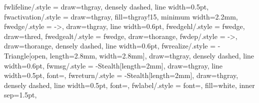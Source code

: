 {    fwlifeline/.style = {draw=thgray, densely dashed, line width=0.5pt},
    fwactivation/.style = {draw=thgray, fill=thgray!15, minimum width=2.2mm},
    fwedge/.style     = {->, draw=thgray, line width=0.6pt},
    fwedgehl/.style   = {fwedge, draw=thred},
    fwedgealt/.style  = {fwedge, draw=thorange},
    fwdep/.style      = {->, draw=thorange, densely dashed, line width=0.6pt},
    fwrealize/.style  = {-{Triangle[open, length=2.8mm, width=2.8mm]}, draw=thgray, densely dashed, line width=0.6pt},
    fwmsg/.style      = {-{Stealth[length=2mm]}, draw=thgray, line width=0.5pt, font=\scriptsize\sffamily},
    fwreturn/.style   = {-{Stealth[length=2mm]}, draw=thgray, densely dashed, line width=0.5pt, font=\scriptsize\sffamily},
    fwlabel/.style    = {font=\scriptsize\sffamily, fill=white, inner sep=1.5pt},
}
